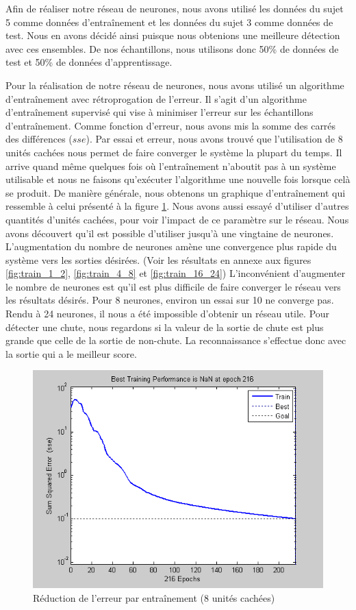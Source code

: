 \documentclass[12pt,letterpaper]{article}
\begin{document}
Afin de réaliser notre réseau de neurones, nous avons utilisé les données du sujet 5 comme données d'entraînement et les données du sujet 3 comme données de test. Nous en avons décidé ainsi puisque nous obtenions une meilleure détection avec ces ensembles. De nos échantillons, nous utilisons donc 50\%  de données de test et 50\% de données d'apprentissage.

Pour la réalisation de notre réseau de neurones, nous avons utilisé un algorithme d'entraînement avec rétroprogation de l'erreur. Il s'agit d'un algorithme d'entraînement supervisé qui vise à minimiser l'erreur sur les échantillons d'entraînement. Comme fonction d'erreur, nous avons mis la somme des carrés des différences ($sse$). Par essai et erreur, nous avons trouvé que l'utilisation de 8 unités cachées nous permet de faire converger le système la plupart du temps. Il arrive quand même quelques fois où l'entraînement n'aboutit pas à un système utilisable et nous ne faisons qu'exécuter l'algorithme une nouvelle fois lorsque celà se produit. De manière générale, nous obtenons un graphique d'entraînement qui ressemble à celui présenté à la figure \ref{fig:training_8units}. Nous avons aussi essayé d'utiliser d'autres quantités d'unités cachées, pour voir l'impact de ce paramètre sur le réseau. Nous avons découvert qu'il est possible d'utiliser jusqu'à une vingtaine de neurones. L'augmentation du nombre de neurones amène une convergence plus rapide du système vers les sorties désirées. (Voir les résultats en annexe aux figures \ref{fig:train_1_2}, \ref{fig:train_4_8} et \ref{fig:train_16_24}) L'inconvénient d'augmenter le nombre de neurones est qu'il est plus difficile de faire converger le réseau vers les résultats désirés. Pour 8 neurones, environ un essai sur 10 ne converge pas. Rendu à 24 neurones, il nous a été impossible d'obtenir un réseau utile. Pour détecter une chute, nous regardons si la valeur de la sortie de chute est plus grande que celle de la sortie de non-chute. La reconnaissance s'effectue donc avec la sortie qui a le meilleur score.

\begin{figure}
    \centering
    \includegraphics[scale=0.6]{image/training_8units.png}
    \caption{Réduction de l'erreur par entraînement (8 unités cachées)}
    \label{fig:training_8units}
\end{figure}
\end{document}
